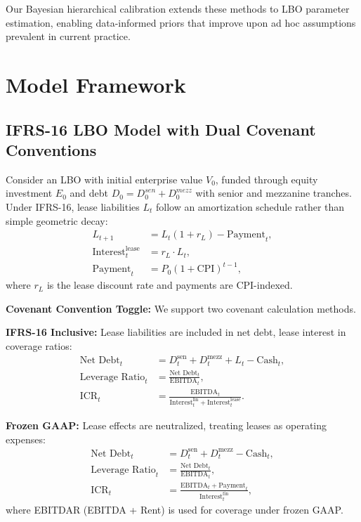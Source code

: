 \documentclass[11pt,a4paper]{article}
\theoremstyle{plain}
\theoremstyle{definition}
\begin{document}
Our Bayesian hierarchical calibration extends these methods to LBO parameter estimation, enabling data-informed priors that improve upon ad hoc assumptions prevalent in current practice.

\section{Model Framework}

\subsection{IFRS-16 LBO Model with Dual Covenant Conventions}

Consider an LBO with initial enterprise value $V_0$, funded through equity investment $E_0$ and debt $D_0 = D_0^{sen} + D_0^{mezz}$ with senior and mezzanine tranches. Under IFRS-16, lease liabilities $L_t$ follow an amortization schedule rather than simple geometric decay:
\begin{align}
L_{t+1} &= L_t(1 + r_L) - \text{Payment}_t, \\
\text{Interest}_t^{\text{lease}} &= r_L \cdot L_t, \\
\text{Payment}_t &= P_0(1 + \text{CPI})^{t-1},
\end{align}
where $r_L$ is the lease discount rate and payments are CPI-indexed.

\textbf{Covenant Convention Toggle:} We support two covenant calculation methods.

\textbf{IFRS-16 Inclusive:} Lease liabilities are included in net debt, lease interest in coverage ratios:
\begin{align}
\text{Net Debt}_t &= D_t^{\text{sen}} + D_t^{\text{mezz}} + L_t - \text{Cash}_t, \\
\text{Leverage Ratio}_t &= \frac{\text{Net Debt}_t}{\text{EBITDA}_t}, \\
\text{ICR}_t &= \frac{\text{EBITDA}_t}{\text{Interest}_t^{\text{fin}} + \text{Interest}_t^{\text{lease}}}.
\end{align}

\textbf{Frozen GAAP:} Lease effects are neutralized, treating leases as operating expenses:
\begin{align}
\text{Net Debt}_t &= D_t^{\text{sen}} + D_t^{\text{mezz}} - \text{Cash}_t, \\
\text{Leverage Ratio}_t &= \frac{\text{Net Debt}_t}{\text{EBITDA}_t}, \\
\text{ICR}_t &= \frac{\text{EBITDA}_t + \text{Payment}_t}{\text{Interest}_t^{\text{fin}}},
\end{align}
where EBITDAR (EBITDA + Rent) is used for coverage under frozen GAAP.
\end{document}
